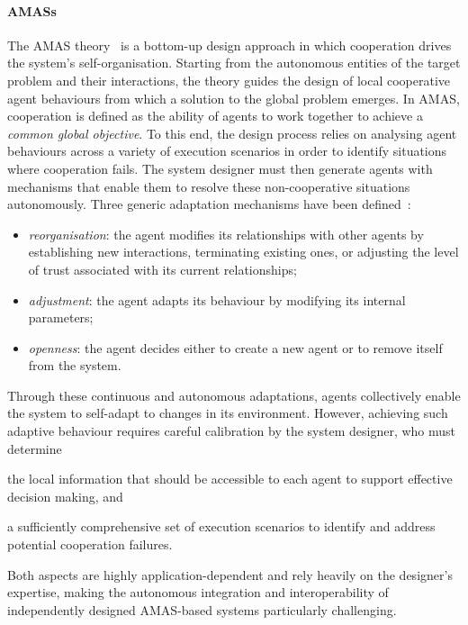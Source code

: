 \paragraph{\aclp{AMAS}}
The \ac{AMAS} theory~\cite{gleizes1999theory,gleizes2007engineering}
is a bottom-up design approach
in which cooperation drives the system's self-organisation.
%
Starting from the autonomous entities of the
target problem and their interactions,
the theory guides the design of
local cooperative agent behaviours
from which a solution to the global problem emerges.
%
In \ac{AMAS},
cooperation is defined as
the ability of agents to work together to achieve a \emph{common global objective}.
%
To this end,
the design process relies on
analysing agent behaviours across a variety of execution scenarios
in order to identify situations where cooperation fails.
%
The system designer
must then generate agents with mechanisms that
enable them to resolve these non-cooperative situations autonomously.
%
Three generic adaptation mechanisms have been defined~\cite{bonnet2017multi}:
\begin{itemize}
    \item \emph{reorganisation}:
    the agent modifies its relationships with other agents by
    establishing new interactions,
    terminating existing ones,
    or adjusting the level of trust associated with its current relationships;

    \item \emph{adjustment}:
    the agent adapts its behaviour by modifying its internal parameters;

    \item \emph{openness}:
    the agent decides either to create a new agent or to remove itself from the system.
\end{itemize}
%
Through these continuous and autonomous adaptations,
agents collectively enable the system to self-adapt to changes in its environment.
%
However,
achieving such adaptive behaviour requires
careful calibration by the system designer,
who must determine
\begin{enumerate*}[label=(\roman*)]
    \item the local information that should be accessible
    to each agent to support effective decision making,
    and
    \item a sufficiently comprehensive set of execution scenarios
    to identify and address potential cooperation failures.
\end{enumerate*}
%
Both aspects are highly
application-dependent
and
rely heavily on the designer's expertise,
making the autonomous integration and interoperability
of independently designed \ac{AMAS}-based systems particularly challenging.

